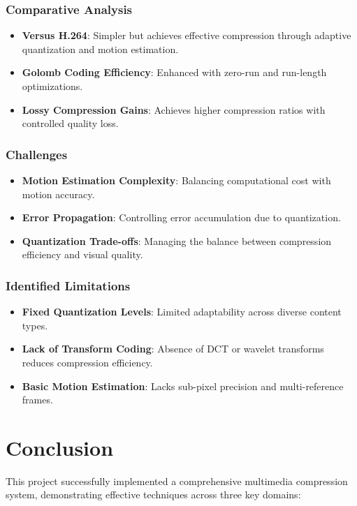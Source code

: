 \documentclass[a4paper,14pt]{article}
\begin{document}
\subsubsection{Comparative Analysis}
\begin{itemize}
\item \textbf{Versus H.264}: Simpler but achieves effective compression through adaptive quantization and motion estimation.
\item \textbf{Golomb Coding Efficiency}: Enhanced with zero-run and run-length optimizations.
\item \textbf{Lossy Compression Gains}: Achieves higher compression ratios with controlled quality loss.
\end{itemize}

\subsubsection{Challenges}
\begin{itemize}
\item \textbf{Motion Estimation Complexity}: Balancing computational cost with motion accuracy.
\item \textbf{Error Propagation}: Controlling error accumulation due to quantization.
\item \textbf{Quantization Trade-offs}: Managing the balance between compression efficiency and visual quality.
\end{itemize}

\subsubsection{Identified Limitations}
\begin{itemize}
\item \textbf{Fixed Quantization Levels}: Limited adaptability across diverse content types.
\item \textbf{Lack of Transform Coding}: Absence of DCT or wavelet transforms reduces compression efficiency.
\item \textbf{Basic Motion Estimation}: Lacks sub-pixel precision and multi-reference frames.
\end{itemize}


\section{Conclusion}
This project successfully implemented a comprehensive multimedia compression system, demonstrating effective techniques across three key domains:
\end{document}

